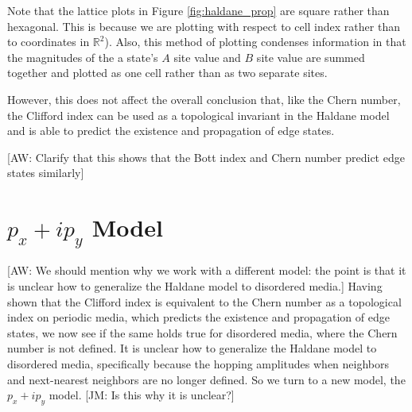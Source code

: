 \documentclass[a4paper]{article}
\newcommand{\aw}[1]{{\color{blue} [AW: #1]}}
\newcommand{\jm}[1]{{\color{red} [JM: #1]}}
\begin{document}
Note that the lattice plots in Figure \ref{fig:haldane_prop} are square rather than hexagonal.
This is because we are plotting with respect to cell index rather than to coordinates in $\mathbb{R}^2$).
Also, this method of plotting condenses information in that the magnitudes of the a state's $A$ site value and $B$ site value are summed together and plotted as one cell rather than as two separate sites.

However, this does not affect the overall conclusion that, like the Chern number, the Clifford index can be used as a topological invariant in the Haldane model and is able to predict the existence and propagation of edge states.

\aw{Clarify that this shows that the Bott index and Chern number predict edge states similarly}

\section{\texorpdfstring{$p_x + ip_y$}{px + ipy} Model}
\aw{We should mention why we work with a different model: the point is that it is unclear how to generalize the Haldane model to disordered media.}
Having shown that the Clifford index is equivalent to the Chern number as a topological index on periodic media, which predicts the existence and propagation of edge states, we now see if the same holds true for disordered media, where the Chern number is not defined.
It is unclear how to generalize the Haldane model to disordered media, specifically because the hopping amplitudes when neighbors and next-nearest neighbors are no longer defined.
So we turn to a new model, the $p_x + ip_y$ model.
\jm{Is this why it is unclear?}
\end{document}
